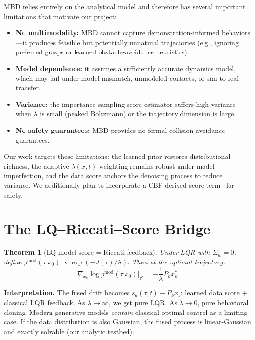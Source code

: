 \documentclass[11pt,letterpaper]{article}
\theoremstyle{plain}
\newtheorem{theorem}{Theorem}[section]
\theoremstyle{definition}
\theoremstyle{remark}
\newcommand{\grad}{\nabla}
\begin{document}
MBD relies entirely on the analytical model and therefore has several
important limitations that motivate our project:
\begin{itemize}[nosep]
  \item \textbf{No multimodality:} MBD cannot capture
    demonstration-informed behaviors---it produces feasible but
    potentially unnatural trajectories (e.g., ignoring preferred grasps
    or learned obstacle-avoidance heuristics).
  \item \textbf{Model dependence:} it assumes a sufficiently accurate
    dynamics model, which may fail under model mismatch, unmodeled
    contacts, or sim-to-real transfer.
  \item \textbf{Variance:} the importance-sampling score estimator
    suffers high variance when $\lambda$ is small (peaked Boltzmann) or
    the trajectory dimension is large.
  \item \textbf{No safety guarantees:} MBD provides no formal
    collision-avoidance guarantees.
\end{itemize}
Our work targets these limitations: the learned prior restores
distributional richness, the adaptive $\lambda(x,t)$ weighting remains
robust under model imperfection, and the data score anchors the
denoising process to reduce variance.  We additionally plan to
incorporate a CBF-derived score term~\citep{safeflow} for safety.

\section{The LQ--Riccati--Score Bridge}\label{sec:lqbridge}

\begin{theorem}[LQ model-score = Riccati feedback]\label{thm:lq-score}
Under LQR with $\Sigma_w=0$, define
$p^{\mathrm{mod}}(\tau|x_0)\propto\exp(-J(\tau)/\lambda)$. Then at the
optimal trajectory:
\begin{equation}
  \boxed{\grad_{x_k}\log p^{\mathrm{mod}}(\tau|x_0)\big|_{\tau^*}
  =-\frac{1}{\lambda}P_kx_k^*}
  \label{eq:lq-score}
\end{equation}
\end{theorem}

\textbf{Interpretation.}
The fused drift becomes $s_\theta(\tau,t)-P_kx_k$: learned data score
+ classical LQR feedback. As $\lambda\to\infty$, we get pure LQR.
As $\lambda\to 0$, pure behavioral cloning. Modern generative models
\emph{contain} classical optimal control as a limiting case.
If the data distribution is also Gaussian, the fused process is
linear-Gaussian and exactly solvable (our analytic testbed).
\end{document}

